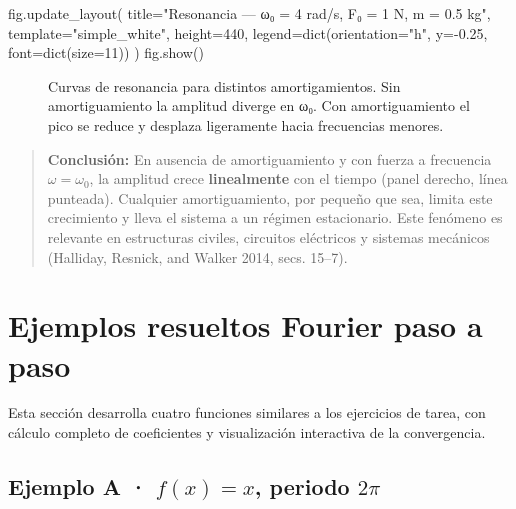 \documentclass[
  letterpaper,
  DIV=11,
  numbers=noendperiod]{scrreprt}
\newenvironment{Shaded}{\begin{snugshade}}{\end{snugshade}}
\newcommand{\BuiltInTok}[1]{\textcolor[rgb]{0.00,0.23,0.31}{#1}}
\newcommand{\DecValTok}[1]{\textcolor[rgb]{0.68,0.00,0.00}{#1}}
\newcommand{\FloatTok}[1]{\textcolor[rgb]{0.68,0.00,0.00}{#1}}
\newcommand{\NormalTok}[1]{\textcolor[rgb]{0.00,0.23,0.31}{#1}}
\newcommand{\OperatorTok}[1]{\textcolor[rgb]{0.37,0.37,0.37}{#1}}
\newcommand{\StringTok}[1]{\textcolor[rgb]{0.13,0.47,0.30}{#1}}
\begin{document}
\begin{Shaded}
\begin{Highlighting}[]
\NormalTok{fig.update\_layout(}
\NormalTok{    title}\OperatorTok{=}\StringTok{"Resonancia — ω₀ = 4 rad/s, F₀ = 1 N, m = 0.5 kg"}\NormalTok{,}
\NormalTok{    template}\OperatorTok{=}\StringTok{"simple\_white"}\NormalTok{,}
\NormalTok{    height}\OperatorTok{=}\DecValTok{440}\NormalTok{,}
\NormalTok{    legend}\OperatorTok{=}\BuiltInTok{dict}\NormalTok{(orientation}\OperatorTok{=}\StringTok{"h"}\NormalTok{, y}\OperatorTok{={-}}\FloatTok{0.25}\NormalTok{, font}\OperatorTok{=}\BuiltInTok{dict}\NormalTok{(size}\OperatorTok{=}\DecValTok{11}\NormalTok{))}
\NormalTok{)}
\NormalTok{fig.show()}
\end{Highlighting}
\end{Shaded}

\begin{figure}


\caption{\label{fig-osc-4}Curvas de resonancia para distintos
amortigamientos. Sin amortiguamiento la amplitud diverge en ω₀. Con
amortiguamiento el pico se reduce y desplaza ligeramente hacia
frecuencias menores.}

\end{figure}%

\begin{quote}
\textbf{Conclusión:} En ausencia de amortiguamiento y con fuerza a
frecuencia \(\omega = \omega_0\), la amplitud crece \textbf{linealmente}
con el tiempo (panel derecho, línea punteada). Cualquier
amortiguamiento, por pequeño que sea, limita este crecimiento y lleva el
sistema a un régimen estacionario. Este fenómeno es relevante en
estructuras civiles, circuitos eléctricos y sistemas mecánicos
(Halliday, Resnick, and Walker 2014, secs. 15--7).
\end{quote}

\chapter{Ejemplos resueltos Fourier paso a paso}\label{sec-resueltos}

Esta sección desarrolla cuatro funciones similares a los ejercicios de
tarea, con cálculo completo de coeficientes y visualización interactiva
de la convergencia.

\section{\texorpdfstring{Ejemplo A · \(f(x) = x\), periodo
\(2\pi\)}{Ejemplo A · f(x) = x, periodo 2\textbackslash pi}}\label{sec-ej-a}
\end{document}

